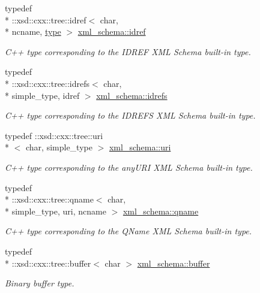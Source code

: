 \begin{DoxyCompactItemize}
typedef \\*
\-::xsd\-::cxx\-::tree\-::idref$<$ char, \\*
ncname, \hyperlink{classtype}{type} $>$ \hyperlink{namespacexml__schema_a50fe7403f3e6be3634976c84c1ea1f8c}{xml\-\_\-schema\-::idref}
\begin{DoxyCompactList}\small\item\em C++ type corresponding to the I\-D\-R\-E\-F X\-M\-L Schema built-\/in type. \end{DoxyCompactList}\item 
typedef \\*
\-::xsd\-::cxx\-::tree\-::idrefs$<$ char, \\*
simple\-\_\-type, idref $>$ \hyperlink{namespacexml__schema_aac27fe5af9a5b2ee009fd3c9abe3abe9}{xml\-\_\-schema\-::idrefs}
\begin{DoxyCompactList}\small\item\em C++ type corresponding to the I\-D\-R\-E\-F\-S X\-M\-L Schema built-\/in type. \end{DoxyCompactList}\item 
typedef \-::xsd\-::cxx\-::tree\-::uri\\*
$<$ char, simple\-\_\-type $>$ \hyperlink{namespacexml__schema_aad28b7e5769e04950db7f4bd15c163be}{xml\-\_\-schema\-::uri}
\begin{DoxyCompactList}\small\item\em C++ type corresponding to the any\-U\-R\-I X\-M\-L Schema built-\/in type. \end{DoxyCompactList}\item 
typedef \\*
\-::xsd\-::cxx\-::tree\-::qname$<$ char, \\*
simple\-\_\-type, uri, ncname $>$ \hyperlink{namespacexml__schema_a5343b1a86a36b809f1acf953a2497af2}{xml\-\_\-schema\-::qname}
\begin{DoxyCompactList}\small\item\em C++ type corresponding to the Q\-Name X\-M\-L Schema built-\/in type. \end{DoxyCompactList}\item 
typedef \\*
\-::xsd\-::cxx\-::tree\-::buffer$<$ char $>$ \hyperlink{namespacexml__schema_a3a1af5d598f84fcd6707cc9f84880533}{xml\-\_\-schema\-::buffer}
\begin{DoxyCompactList}\small\item\em Binary buffer type. \end{DoxyCompactList}\item 

\end{DoxyCompactItemize}
